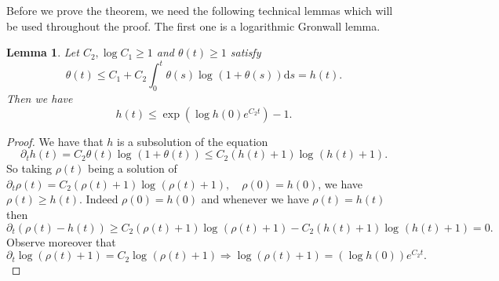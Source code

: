 \documentclass[11pt, oneside]{article}   	%
\newcommand{\mathd}{\mathrm{d}}
\newtheorem{lemma}[theorem]{Lemma}
\begin{document}
Before we prove the theorem, we need the following technical lemmas which will be used throughout the proof. The first one is a logarithmic Gronwall lemma.

\begin{lemma} \label{lem:loggronwall}
	Let $C_2,  \log C_1 \geq 1$ and $\theta(t)\ge1$ satisfy 
	\[
	\theta (t) \le C_1  + C_2 \int_0^t \theta (s) \log^{}
	(1+\theta (s)) \mathd s = h (t) .
	\]
	Then we have
	\[
	h (t) \le \exp (\log h (0) e^{C_2 t})-1 .
	\]
\end{lemma}

\begin{proof}
	We have that $h$ is a subsolution of the equation
	\[ \partial_t h (t) = C_2 \theta (t) \log^{} (1 + \theta (t)) \le C_2 (h(t)+1) \log^{} (h (t)+1) . \]
	So taking $\rho (t)$ being a solution of \ $\partial_t \rho (t) = C_2 (\rho (t)+1)
	\log^{} (\rho (t)+1), \quad \rho (0) = h (0)$, we have $\rho (t) \ge h
	(t)$. Indeed $\rho (0) = h (0)$ and whenever we have $\rho (t) = h (t)$ then
	\[ \partial_t (\rho (t) - h (t)) \ge C_2( \rho (t)+1 )\log^{} (\rho (t)+1) -
	C_2 (h (t)+1 )\log^{} (h (t)+1) = 0. \]
	Observe moreover that
	\[ \partial_t \log (\rho (t) +1) = C_2 \log^{} (\rho (t) +1) \Rightarrow \log (\rho (t) +1)
	= (\log h (0)) e^{C_2 t} . \]
\end{proof}
\end{document}
